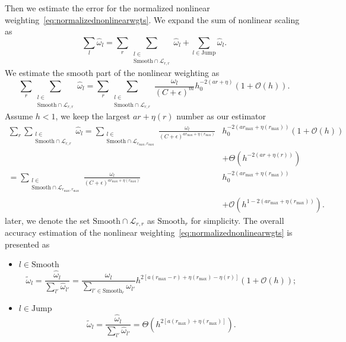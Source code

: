 Then we estimate the error for the normalized nonlinear weighting~\eqref{eq:normalizednonlinearwgts}.
We expand the sum of nonlinear scaling as
\begin{equation}
		  \sum_l \hat{\omega}_l = \sum_r \sum_{\substack{l\in \\\text{Smooth}\cap \mathcal{L}_{r,r}}} \hat{\omega}_l + \sum_{l\in \text{Jump}} \hat{\omega}_l.
\end{equation}
We estimate the smooth part of the nonlinear weighting as
\begin{equation}
\sum_r \sum_{\substack{l\in \\\text{Smooth}\cap \mathcal{L}_{r,r}}} \hat{\omega}_l = \sum_r \sum_{\substack{l\in \\\text{Smooth}\cap \mathcal{L}_{r,r}}} 
		  \frac{\omega_l}{(C+\epsilon)^m}h_0^{-2(ar+\eta)} (1+\mathcal{O}(h)).
\end{equation}
Assume $h<1$, we keep the largest $ar+\eta(r)$ number as our estimator
\begin{equation}
		  \begin{aligned}
					 \sum_r \sum_{\substack{l\in \\\text{Smooth}\cap \mathcal{L}_{r,r}}} \hat{\omega}_l = \sum_{\substack{l\in \\\text{Smooth}\cap \mathcal{L}_{r_{\max},r_{\max}}}} 
					 \frac{\omega_l}{(C+\epsilon)^{ar_{\max} + \eta(r_{\max})}}&h_0^{-2(ar_{\max}+\eta(r_{\max}))} (1+\mathcal{O}(h)) \\
					 &+ \Theta(h^{-2(ar+\eta(r))})\\
					 = \sum_{\substack{l\in \\\text{Smooth}\cap \mathcal{L}_{r_{\max},r_{\max}}}}
					 \frac{\omega_l}{(C+\epsilon)^{ar_{\max} + \eta(r_{\max})}}&h_0^{-2(ar_{\max}+\eta(r_{\max}))} \\
					 &+ \mathcal{O}(h^{1-2(ar_{\max}+\eta(r_{\max}))}).
		  \end{aligned}
\end{equation}
later, we denote the set $\text{Smooth}\cap \mathcal{L}_{r,r}$ as $\text{Smooth}_r$ for 
simplicity.
The overall accuracy estimation of the nonlinear weighting~\eqref{eq:normalizednonlinearwgts} is presented as
\begin{itemize}
\item $l \in \text{Smooth}$
\begin{equation}\label{eq:scalliingestimate}
					 \tilde{\omega}_l = \frac{\hat{\omega}_l}{\sum_{l'} \hat{\omega}_{l'}} =
					 \frac{\omega_l}{\sum_{l' \in \text{Smooth}_r}\omega_{l'}} 
					 h^{2[a(r_{\max} - r) + \eta(r_{\max}) - \eta(r)]} (1 + \mathcal{O}(h));
\end{equation}

\item $l \in \text{Jump}$
\begin{equation}\label{eq:scalliingestimate}
					 \tilde{\omega}_l = \frac{\hat{\omega}_l}{\sum_{l'} \hat{\omega}_{l'}} =
					 \Theta
					 (h^{2[a(r_{\max}) + \eta(r_{\max})]}).
\end{equation}

\end{itemize}
